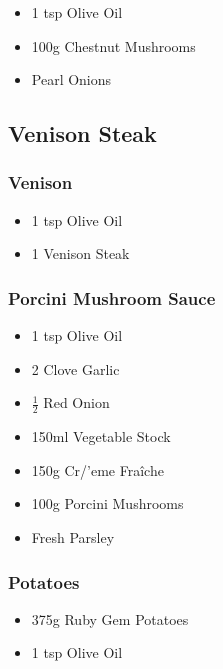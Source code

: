 \documentclass[11pt, english]{article}
\begin{document}
	\begin{itemize}
	\setlength\itemsep{0cm}
		\item 1 tsp Olive Oil
		\item 100g Chestnut Mushrooms
		\item Pearl Onions
	\end{itemize}

\newpage

	\subsection{Venison Steak}

		\subsubsection*{Venison}

	\begin{itemize}
        \setlength\itemsep{0cm}
                \item 1 tsp Olive Oil
		\item 1 Venison Steak
        \end{itemize}

		\subsubsection*{Porcini Mushroom Sauce}

	\begin{itemize}
        \setlength\itemsep{0cm}
                \item 1 tsp Olive Oil
		\item 2 Clove Garlic
		\item $\frac{1}{2}$ Red Onion
		\item 150ml Vegetable Stock 
		\item 150g Cr/'{e}me Fra\^{i}che
		\item 100g Porcini Mushrooms
		\item Fresh Parsley
        \end{itemize}

		\subsubsection*{Potatoes}

        \begin{itemize}
        \setlength\itemsep{0cm}
                \item 375g Ruby Gem Potatoes
		\item 1 tsp Olive Oil
        \end{itemize}
\end{document}
